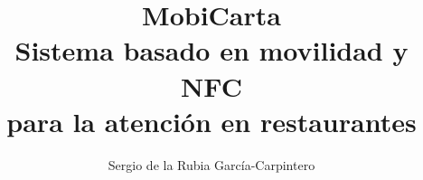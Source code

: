 
\title{MobiCarta\\Sistema basado en movilidad y NFC\\para la atención en
restaurantes}
\author{Sergio de la Rubia García-Carpintero}{}






